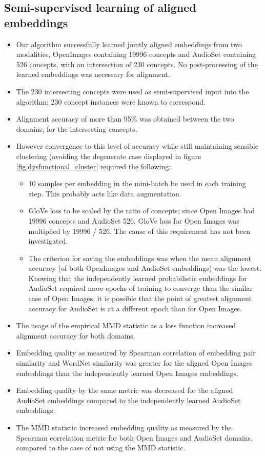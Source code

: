 \subsection{Semi-supervised learning of aligned embeddings}

\begin{itemize}
    \item Our algorithm successfully learned jointly aligned embeddings from two modalities, OpenImages containing 19996 concepts and AudioSet containing 526 concepts, with an intersection of 230 concepts. No post-processing of the learned embeddings was necessary for alignment. 
    \item The 230 intersecting concepts were used as semi-supervised input into the algorithm; 230 concept instances were known to correspond.
    \item Alignment accuracy of more than 95\% was obtained between the two domains, for the intersecting concepts.
    \item However convergence to this level of accuracy while still maintaining sensible clustering (avoiding the degenerate case displayed in figure \ref{fig:dysfunctional_cluster} required the following:
    \begin{itemize}
        \item 10 samples per embedding in the mini-batch be used in each training step. This probably acts like data augmentation. 
        \item GloVe loss to be scaled by the ratio of concepts; since Open Images had 19996 concepts and AudioSet 526, GloVe loss for Open Images was multiplied by 19996 / 526. The cause of this requirement has not been investigated. 
        \item The criterion for saving the embeddings was when the mean alignment accuracy (of both OpenImages and AudioSet embeddings) was the lowest. Knowing that the independently learned probabilistic embeddings for AudioSet required more epochs of training to converge than the similar case of Open Images, it is possible that the point of greatest alignment accuracy for AudioSet is at a different epoch than for Open Images. 
    \end{itemize}
    \item The usage of the empirical MMD statistic as a loss function increased alignment accuracy for both domains.
    \item Embedding quality as measured by Spearman correlation of embedding pair similarity and WordNet similarity was greater for the aligned Open Images embeddings than the independently learned Open Images embeddings.
    \item Embedding quality by the same metric was decreased for the aligned AudioSet embeddings compared to the independently learned AudioSet embeddings. 
    \item The MMD statistic increased embedding quality as measured by the Spearman correlation metric for both Open Images and AudioSet domains, compared to the case of not using the MMD statistic. 
\end{itemize}

